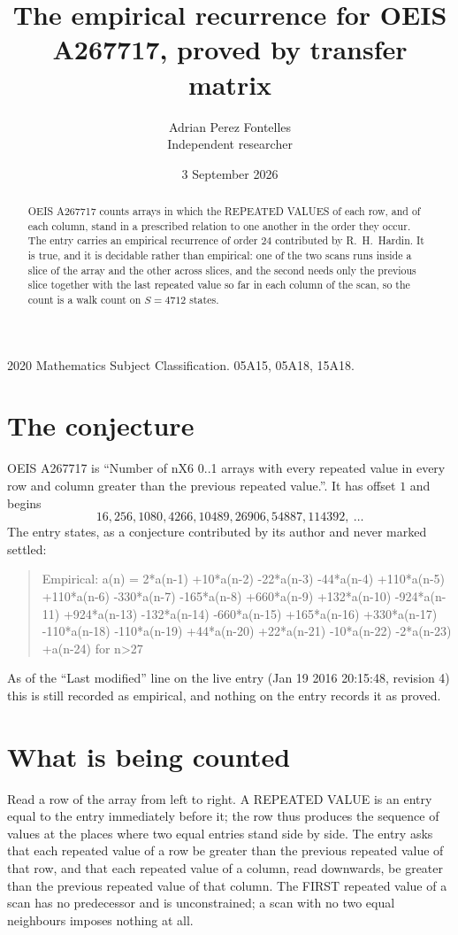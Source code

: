 \documentclass[11pt,a4paper]{article}
\title{The empirical recurrence for OEIS A267717, proved by transfer matrix}
\author{Adrian Perez Fontelles\\ \small Independent researcher}
\date{3 September 2026}
\theoremstyle{plain}
\theoremstyle{definition}
\begin{document}
\maketitle

\begin{abstract}
OEIS A267717 counts arrays in which the REPEATED VALUES of each row, and of each column, stand in a
prescribed relation to one another in the order they occur. The entry carries an empirical
recurrence of order $24$ contributed by R.~H.~Hardin. It is true, and it is decidable
rather than empirical: one of the two scans runs inside a slice of the array and the other
across slices, and the second needs only the previous slice together with the last repeated
value so far in each column of the scan, so the count is a walk count on $S=4712$ states.
\end{abstract}

\noindent\small 2020 Mathematics Subject Classification. 05A15, 05A18, 15A18.\normalsize

\section{The conjecture}

OEIS A267717 is ``Number of nX6 0..1 arrays with every repeated value in every row and column greater than the previous repeated value.''. It has offset $1$ and begins
\[
16, 256, 1080, 4266, 10489, 26906, 54887, 114392,\ \dots
\]
The entry states, as a conjecture contributed by its author and never marked settled:
\begin{quote}
Empirical: a(n) = 2*a(n-1) +10*a(n-2) -22*a(n-3) -44*a(n-4) +110*a(n-5) +110*a(n-6) -330*a(n-7) -165*a(n-8) +660*a(n-9) +132*a(n-10) -924*a(n-11) +924*a(n-13) -132*a(n-14) -660*a(n-15) +165*a(n-16) +330*a(n-17) -110*a(n-18) -110*a(n-19) +44*a(n-20) +22*a(n-21) -10*a(n-22) -2*a(n-23) +a(n-24) for n>27
\end{quote}
As of the ``Last modified'' line on the live entry (Jan 19 2016 20:15:48, revision 4) this is still
recorded as empirical, and nothing on the entry records it as proved.

\section{What is being counted}

Read a row of the array from left to right. A REPEATED VALUE is an entry equal to the entry
immediately before it; the row thus produces the sequence of values at the places where two
equal entries stand side by side. The entry asks that each repeated value of a row be
greater than the previous repeated value of that row, and that each repeated value of a column,
read downwards, be greater than the previous repeated value of that column. The FIRST repeated
value of a scan has no predecessor and is unconstrained; a scan with no two equal neighbours
imposes nothing at all.
\end{document}
